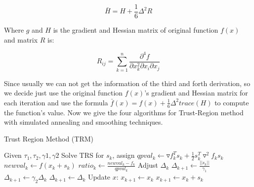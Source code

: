\documentclass[letterpaper,12pt,titlepage,oneside,final]{book}
\begin{document}
\begin{equation}
\bar{H}=H+\frac{1}{6}\Delta^2R
\end{equation} 

Where $g$ and $H$ is the gradient and Hessian matrix of original function $f(x)$ and matrix $R$ is:

\begin{equation}
R_{ij}=\sum_{k=1}^n\frac{\partial^4 f}{\partial x_k^2\partial x_i\partial x_j}
\end{equation}

Since usually we can not get the information of the third and forth derivation, so we decide just use the original function $f(x)$'s gradient and Hessian matrix for each iteration and use the formula $\bar{f}(x)=f(x)+\frac{1}{6}\Delta^2trace(H)$ to compute the function's value. Now we give the four algorithms for Trust-Region method with simulated annealing and smoothing techniques.

\begin{algorithm} [H]
\caption{Trust Region Method (TRM)}
\begin{algorithmic} 
\STATE Given $\tau_1, \tau_2, \gamma1, \gamma2$
\STATE  Solve TRS for $s_k$, assign $qpval_k \leftarrow \triangledown  f^T_ks_k+\frac{1}{2}s^T_k \triangledown^2f_ks_k$
\STATE  $newval_k\leftarrow f(x_k+s_k)$
\STATE  $ratio_k\leftarrow \frac{newval_k-f_k}{qpval_k}$
\STATE  Adjust $\Delta_k$
\STATE $\Delta_{k+1}\leftarrow \frac{||s_k||}{\gamma_1}$
\ELSE 
{}
\STATE $\Delta_{k+1}\leftarrow \gamma_2 \Delta_k$
\ELSE 
\STATE $\Delta_{k+1}\leftarrow \Delta_k$
\ENDIF
\ENDIF
\STATE Update $x$:
\STATE $x_{k+1}\leftarrow x_k$
\ELSE 
\STATE $x_{k+1}\leftarrow x_k+s_k$
\ENDIF
\ENDWHILE
\end{algorithmic}
\end{algorithm}
\end{document}
